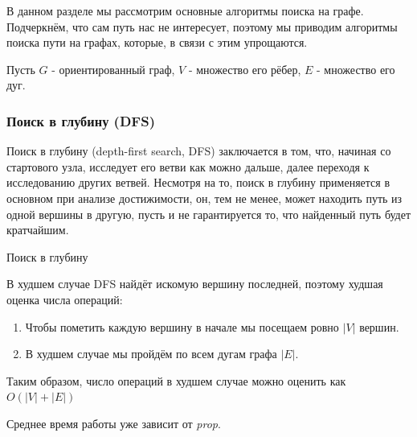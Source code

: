 В данном разделе мы рассмотрим основные алгоритмы поиска на графе. Подчеркнём, что сам путь нас не интересует, поэтому мы приводим алгоритмы поиска пути на графах, которые, в связи с этим упрощаются.

Пусть $G$ - ориентированный граф, $V$ - множество его рёбер, $E$ - множество его дуг.

\subsubsection{Поиск в глубину (DFS)} \label{DFS-algo}

Поиск в глубину (depth-first search, DFS) заключается в том, что, начиная со стартового узла, исследует его ветви как можно дальше, далее переходя к исследованию других ветвей. Несмотря на то, поиск в глубину применяется в основном при анализе достижимости, он, тем не менее, может находить путь из одной вершины в другую, пусть и не гарантируется то, что найденный путь будет кратчайшим.

\begin{algorithm}[H]
\SetAlgoLined
{}

\caption{Поиск в глубину}
\label{algo:DFS}
\end{algorithm}

В худшем случае DFS найдёт искомую вершину последней, поэтому худшая оценка числа операций:
\begin{enumerate}
    \item Чтобы пометить каждую вершину в начале мы посещаем ровно $|V|$ вершин.
    \item В худшем случае мы пройдём по всем дугам графа $|E|$.
\end{enumerate}

Таким образом, число операций в худшем случае можно оценить как $O(|V| + |E|)$

Среднее время работы уже зависит от \textit{prop}.

